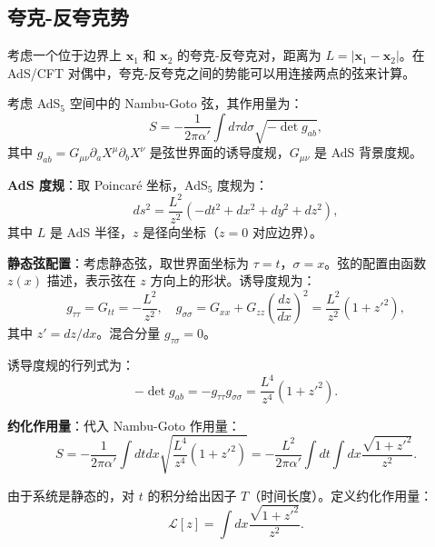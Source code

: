 \subsection{夸克-反夸克势}

考虑一个位于边界上 $\mathbf{x}_1$ 和 $\mathbf{x}_2$ 的夸克-反夸克对，距离为 $L = |\mathbf{x}_1 - \mathbf{x}_2|$。在 AdS/CFT 对偶中，夸克-反夸克之间的势能可以用连接两点的弦来计算。

\begin{note}[弦的作用量]
考虑 AdS$_5$ 空间中的 Nambu-Goto 弦，其作用量为：
\begin{equation}
    S = -\frac{1}{2\pi \alpha'} \int d\tau d\sigma \sqrt{-\det g_{ab}},
\end{equation}
其中 $g_{ab} = G_{\mu\nu} \partial_a X^\mu \partial_b X^\nu$ 是弦世界面的诱导度规，$G_{\mu\nu}$ 是 AdS 背景度规。
\end{note}

\textbf{AdS 度规}：取 Poincaré 坐标，AdS$_5$ 度规为：
\begin{equation}
    ds^2 = \frac{L^2}{z^2} \left(-dt^2 + dx^2 + dy^2 + dz^2\right),
\end{equation}
其中 $L$ 是 AdS 半径，$z$ 是径向坐标（$z=0$ 对应边界）。

\textbf{静态弦配置}：考虑静态弦，取世界面坐标为 $\tau = t$，$\sigma = x$。弦的配置由函数 $z(x)$ 描述，表示弦在 $z$ 方向上的形状。诱导度规为：
\begin{equation}
    g_{\tau\tau} = G_{tt} = -\frac{L^2}{z^2}, \quad g_{\sigma\sigma} = G_{xx} + G_{zz} \left(\frac{dz}{dx}\right)^2 = \frac{L^2}{z^2} \left(1 + z'^2\right),
\end{equation}
其中 $z' = dz/dx$。混合分量 $g_{\tau\sigma} = 0$。

诱导度规的行列式为：
\begin{equation}
    -\det g_{ab} = -g_{\tau\tau} g_{\sigma\sigma} = \frac{L^4}{z^4} \left(1 + z'^2\right).
\end{equation}

\textbf{约化作用量}：代入 Nambu-Goto 作用量：
\begin{equation}
    S = -\frac{1}{2\pi \alpha'} \int dt dx \sqrt{\frac{L^4}{z^4} \left(1 + z'^2\right)} = -\frac{L^2}{2\pi \alpha'} \int dt \int dx \frac{\sqrt{1 + z'^2}}{z^2}.
\end{equation}

由于系统是静态的，对 $t$ 的积分给出因子 $T$（时间长度）。定义约化作用量：
\begin{equation}
    \mathcal{L}[z] = \int dx \frac{\sqrt{1 + z'^2}}{z^2}.
\end{equation}

